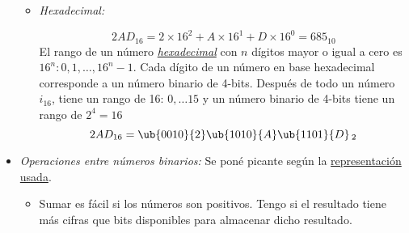 \begin{itemize}[label=\iconTeoriaUno]
\begin{itemize}[label=\iconTeoriaDos]
          \item \textit{Hexadecimal:}\par
                $$
                  2AD_{16} = 2 \times 16^2 + A \times 16^1 + D \times 16^0
                  = 685_{10}
                $$
                El rango de un número \underline{\textit{hexadecimal}} con $n$ dígitos mayor o igual a cero es $16^n: 0,1, \dots, 16^{n} - 1$.
                Cada dígito de un número en base hexadecimal corresponde a un número binario
                de 4-bits. Después de todo un número $i_16$,
                tiene un rango de 16: $0,\dots 15$ y
                un número binario de 4-bits tiene un rango de $2^4 = 16$ \checkmark
                $$
                  2AD_{16} = \ub{0010}{2}\ub{1010}{A}\ub{1101}{D}\,_2
                $$
        \end{itemize}

  \item \textit{Operaciones entre números binarios:} Se poné picante según la \underline{representación usada}.
        \begin{itemize}[label=\iconTeoriaDos]
          \item Sumar es fácil si los números son positivos. Tengo \textit{} si el resultado
                tiene más cifras que bits disponibles para almacenar dicho resultado.
        \end{itemize}


\end{itemize}
